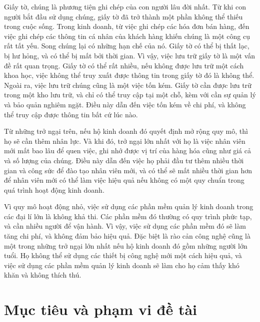 \documentclass[../DoAn.tex]{subfiles}
\begin{document}
Giấy tờ, chúng là phương tiện ghi chép của con người lâu đời nhất. Từ khi con người bắt đầu sử dụng chúng, giấy tờ đã trở thành một phần không thể thiếu trong cuộc sống. Trong kinh doanh, từ việc ghi chép các hóa đơn bán hàng, đến việc ghi chép các thông tin cá nhân của khách hàng khiến chúng là một công cụ rất tất yếu. Song chúng lại có những hạn chế của nó. Giấy tờ có thể bị thất lạc, bị hư hỏng, và có thể bị mất bởi thời gian. Vì vậy, việc lưu trữ giấy tờ là một vấn đề rất quan trọng. Giấy tờ có thể rất nhiều, nếu không được lưu trữ một cách khoa học, việc không thể truy xuất được thông tin trong giấy tờ đó là không thể. Ngoài ra, việc lưu trữ chúng cũng là một việc tốn kém. Giấy tờ cần được lưu trữ trong một kho lưu trữ, và chỉ có thể truy cập tại một chỗ, kèm với cần sự quản lý và bảo quản nghiêm ngặt. Điều này dẫn đến việc tốn kém về chi phí, và không thể truy cập được thông tin bất cứ lúc nào.

Từ những trở ngại trên, nếu hộ kinh doanh đó quyết định mở rộng quy mô, thì họ sẽ cần thêm nhân lực. Và khi đó, trở ngại lớn nhất với họ là việc nhân viên mới mất bao lâu để quen việc, ghi nhớ được vị trí của hàng hóa cũng như giá cả và số lượng của chúng. Điều này dẫn đến việc họ phải đầu tư thêm nhiều thời gian và công sức để đào tạo nhân viên mới, và có thể sẽ mất nhiều thời gian hơn để nhân viên mới có thể làm việc hiệu quả nếu không có một quy chuẩn trong quá trình hoạt động kinh doanh.

Vì quy mô hoạt động nhỏ, việc sử dụng các phần mềm quản lý kinh doanh trong các đại lí lớn là không khả thi. Các phần mềm đó thường có quy trình phức tạp, và cần nhiều người để vận hành. Vì vậy, việc sử dụng các phần mềm đó sẽ làm tăng chi phí, và không đảm bảo hiệu quả. Đặc biệt là rào cản công nghệ cũng là một trong những trở ngại lớn nhất nếu hộ kinh doanh đó gồm những người lớn tuổi. Họ không thể sử dụng các thiết bị công nghệ mới một cách hiệu quả, và việc sử dụng các phần mềm quản lý kinh doanh sẽ làm cho họ cảm thấy khó khăn và không thích thú.


\section{Mục tiêu và phạm vi đề tài}
\label{section:1.2}
\end{document}

